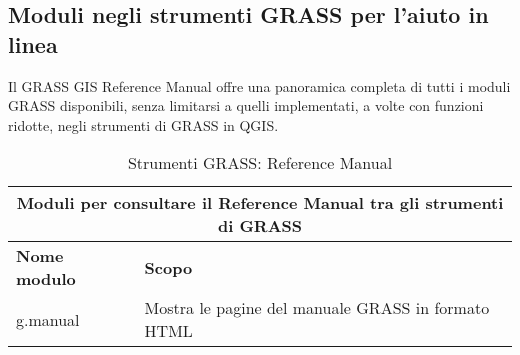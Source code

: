 \subsection{Moduli negli strumenti GRASS per l'aiuto in linea}

Il GRASS GIS Reference Manual offre una panoramica completa di tutti i moduli GRASS disponibili, senza limitarsi a quelli implementati, a volte con funzioni ridotte, negli strumenti di GRASS in QGIS. 

\begin{table}[ht]
\centering
\caption{Strumenti GRASS: Reference Manual}\medskip
 \begin{tabular}{|p{4cm}|p{12cm}|}
  \hline \multicolumn{2}{|c|}{\textbf{Moduli per consultare il Reference Manual tra gli strumenti di GRASS}} \\
  \hline \textbf{Nome modulo} & \textbf{Scopo} \\
  \hline g.manual & Mostra le pagine del manuale GRASS in formato HTML \\
\hline
\end{tabular}
\end{table}




